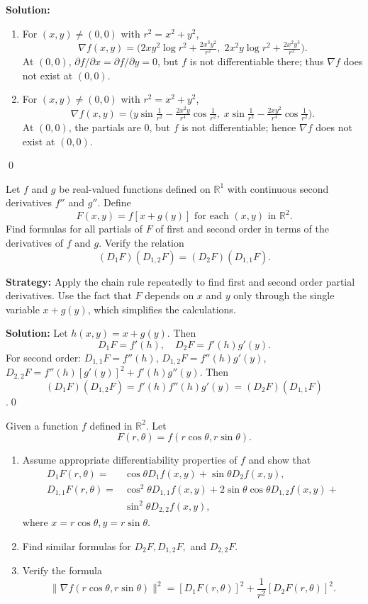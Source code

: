 \bigskip\noindent\textbf{Solution:}
\begin{enumerate}[label=(\alph*)]
\item For $(x,y)\ne(0,0)$ with $r^2=x^2+y^2$,
\[\nabla f(x,y)=\big(2xy^2\log r^2+\tfrac{2x^3y^2}{r^2},\;2x^2y\log r^2+\tfrac{2x^2y^3}{r^2}\big).\]
At $(0,0)$, $\partial f/\partial x=\partial f/\partial y=0$, but $f$ is not differentiable there; thus $\nabla f$ does not exist at $(0,0)$.
\item For $(x,y)\ne(0,0)$ with $r^2=x^2+y^2$,
\[\nabla f(x,y)=\big(y\sin\tfrac{1}{r^2}-\tfrac{2x^2y}{r^4}\cos\tfrac{1}{r^2},\;x\sin\tfrac{1}{r^2}-\tfrac{2xy^2}{r^4}\cos\tfrac{1}{r^2}\big).\]
At $(0,0)$, the partials are $0$, but $f$ is not differentiable; hence $\nabla f$ does not exist at $(0,0)$.
\end{enumerate}\qed


\begin{problembox}
Let \( f \) and \( g \) be real-valued functions defined on \( \mathbb{R}^1 \) with continuous second derivatives \( f'' \) and \( g'' \). Define
\[F(x, y) = f[x + g(y)] \text{ for each } (x, y) \text{ in } \mathbb{R}^2.\]
Find formulas for all partials of \( F \) of first and second order in terms of the derivatives of \( f \) and \( g \). Verify the relation
\[(D_1F)(D_{1,2}F) = (D_2F)(D_{1,1}F).\]
\end{problembox}

\noindent\textbf{Strategy:} Apply the chain rule repeatedly to find first and second order partial derivatives. Use the fact that \( F \) depends on \( x \) and \( y \) only through the single variable \( x + g(y) \), which simplifies the calculations.

\bigskip\noindent\textbf{Solution:}
Let $h(x,y)=x+g(y)$. Then 
\[D_1F=f'(h),\quad D_2F=f'(h)g'(y).\] 
For second order: 
$D_{1,1}F=f''(h)$, $D_{1,2}F=f''(h)g'(y)$, $D_{2,2}F=f''(h)[g'(y)]^2+f'(h)g''(y)$. Then $$(D_1F)(D_{1,2}F)=f'(h)f''(h)g'(y)=(D_2F)(D_{1,1}F)$$.\qed


\begin{problembox}
Given a function \( f \) defined in \( \mathbb{R}^2 \). Let
\[F(r, \theta) = f(r \cos \theta, r \sin \theta).\]
\begin{enumerate}[label=(\alph*)]
\item Assume appropriate differentiability properties of \( f \) and show that
\begin{align*}
D_1F(r, \theta) =& \cos \theta D_1f(x, y) + \sin \theta D_2f(x, y),\\
D_{1,1}F(r, \theta) =& \cos^2 \theta D_{1,1}f(x, y) + 2 \sin \theta \cos \theta D_{1,2}f(x, y) + \\
& \sin^2 \theta D_{2,2}f(x, y),
\end{align*}
where \( x = r \cos \theta, y = r \sin \theta \).
\item Find similar formulas for \( D_2F, D_{1,2}F, \) and \( D_{2,2}F \).
\item Verify the formula
\[\| \nabla f(r \cos \theta, r \sin \theta) \|^2 = [D_1F(r, \theta)]^2 + \frac{1}{r^2} [D_2F(r, \theta)]^2.\]
\end{enumerate}
\end{problembox}

